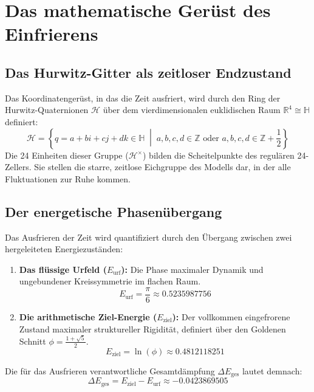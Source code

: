 \documentclass[11pt,a4paper]{article}
\begin{document}
\section{Das mathematische Gerüst des Einfrierens}

\subsection{Das Hurwitz-Gitter als zeitloser Endzustand}
Das Koordinatengerüst, in das die Zeit ausfriert, wird durch den Ring der Hurwitz-Quaternionen $\mathcal{H}$ über dem vierdimensionalen euklidischen Raum $\mathbb{R}^4 \cong \mathbb{H}$ definiert:
\begin{equation}
\mathcal{H} = \left\{ q = a + bi + cj + dk \in \mathbb{H} \;\middle|\; a,b,c,d \in \mathbb{Z} \text{ oder } a,b,c,d \in \mathbb{Z} + \frac{1}{2} \right\}
\end{equation}
Die 24 Einheiten dieser Gruppe ($\mathcal{H}^{\times}$) bilden die Scheitelpunkte des regulären 24-Zellers. Sie stellen die starre, zeitlose Eichgruppe des Modells dar, in der alle Fluktuationen zur Ruhe kommen.

\subsection{Der energetische Phasenübergang}
Das Ausfrieren der Zeit wird quantifiziert durch den Übergang zwischen zwei hergeleiteten Energiezuständen:
\begin{enumerate}
    \item \textbf{Das flüssige Urfeld ($E_{\text{urf}}$):} Die Phase maximaler Dynamik und ungebundener Kreissymmetrie im flachen Raum.
    \begin{equation}
    E_{\text{urf}} = \frac{\pi}{6} \approx 0.5235987756
    \end{equation}
    \item \textbf{Die arithmetische Ziel-Energie ($E_{\text{ziel}}$):} Der vollkommen eingefrorene Zustand maximaler struktureller Rigidität, definiert über den Goldenen Schnitt $\phi = \frac{1+\sqrt{5}}{2}$.
    \begin{equation}
    E_{\text{ziel}} = \ln(\phi) \approx 0.4812118251
    \end{equation}
\end{enumerate}
Die für das Ausfrieren verantwortliche Gesamtdämpfung $\Delta E_{\text{ges}}$ lautet demnach:
\begin{equation}
\Delta E_{\text{ges}} = E_{\text{ziel}} - E_{\text{urf}} \approx -0.0423869505
\end{equation}
\end{document}
